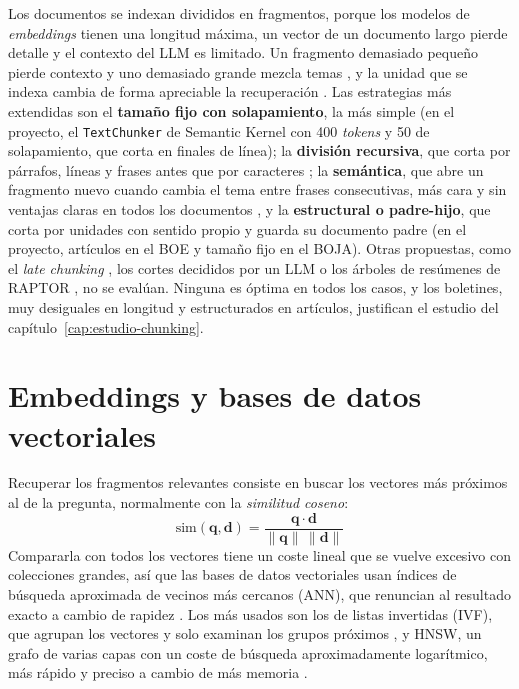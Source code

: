 Los documentos se indexan divididos en fragmentos, porque los modelos de \emph{embeddings} tienen una longitud máxima, un vector de un documento largo pierde detalle y el contexto del LLM es limitado. Un fragmento demasiado pequeño pierde contexto y uno demasiado grande mezcla temas \cite{gao2023}, y la unidad que se indexa cambia de forma apreciable la recuperación \cite{chen2024densex}. Las estrategias más extendidas son el \textbf{tamaño fijo con solapamiento}, la más simple (en el proyecto, el \texttt{TextChunker} de Semantic Kernel con 400 \emph{tokens} y 50 de solapamiento, que corta en finales de línea); la \textbf{división recursiva}, que corta por párrafos, líneas y frases antes que por caracteres \cite{langchainrecursive}; la \textbf{semántica}, que abre un fragmento nuevo cuando cambia el tema entre frases consecutivas, más cara y sin ventajas claras en todos los documentos \cite{qu2025semantic}, y la \textbf{estructural o padre-hijo}, que corta por unidades con sentido propio y guarda su documento padre (en el proyecto, artículos en el BOE y tamaño fijo en el BOJA). Otras propuestas, como el \emph{late chunking} \cite{gunther2024late}, los cortes decididos por un LLM \cite{duarte2024lumber} o los árboles de resúmenes de RAPTOR \cite{sarthi2024raptor}, no se evalúan. Ninguna es óptima en todos los casos, y los boletines, muy desiguales en longitud y estructurados en artículos, justifican el estudio del capítulo~\ref{cap:estudio-chunking}.

\section{Embeddings y bases de datos vectoriales}
\label{sec:vectoriales}

Recuperar los fragmentos relevantes consiste en buscar los vectores más próximos al de la pregunta, normalmente con la \emph{similitud coseno}:
\begin{equation}
  \mathrm{sim}(\mathbf{q}, \mathbf{d}) = \frac{\mathbf{q} \cdot \mathbf{d}}{\lVert \mathbf{q} \rVert \, \lVert \mathbf{d} \rVert}
  \label{eq:coseno}
\end{equation}
Compararla con todos los vectores tiene un coste lineal que se vuelve excesivo con colecciones grandes, así que las bases de datos vectoriales usan índices de búsqueda aproximada de vecinos más cercanos (ANN), que renuncian al resultado exacto a cambio de rapidez \cite{pan2024survey}. Los más usados son los de listas invertidas (IVF), que agrupan los vectores y solo examinan los grupos próximos \cite{jegou2011}, y HNSW, un grafo de varias capas con un coste de búsqueda aproximadamente logarítmico, más rápido y preciso a cambio de más memoria \cite{malkov2020,pgvector}.

